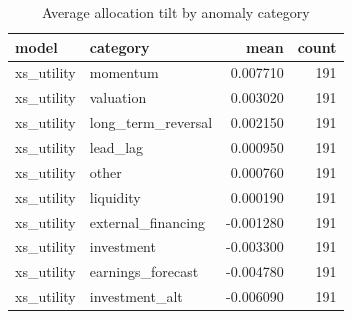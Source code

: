 \begin{table}
\caption{Average allocation tilt by anomaly category}
\label{tab:t9_tilt_by_category}
\begin{tabular}{llrr}
\toprule
model & category & mean & count \\
\midrule
xs\_utility & momentum & 0.007710 & 191 \\
xs\_utility & valuation & 0.003020 & 191 \\
xs\_utility & long\_term\_reversal & 0.002150 & 191 \\
xs\_utility & lead\_lag & 0.000950 & 191 \\
xs\_utility & other & 0.000760 & 191 \\
xs\_utility & liquidity & 0.000190 & 191 \\
xs\_utility & external\_financing & -0.001280 & 191 \\
xs\_utility & investment & -0.003300 & 191 \\
xs\_utility & earnings\_forecast & -0.004780 & 191 \\
xs\_utility & investment\_alt & -0.006090 & 191 \\
\bottomrule
\end{tabular}
\end{table}
